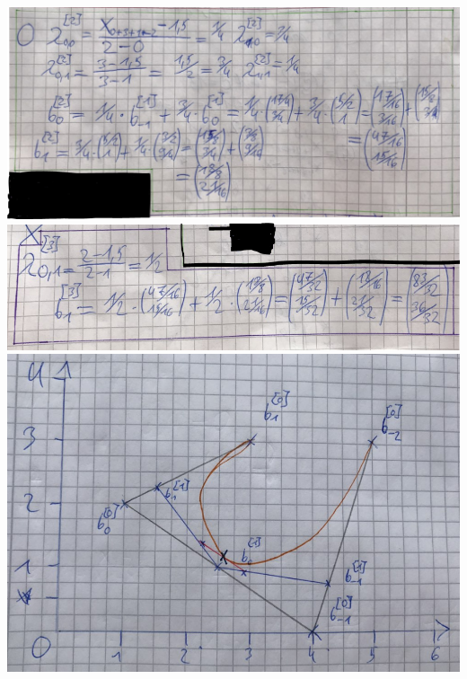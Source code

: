 \\
\includegraphics[scale=0.5]{1b)3.PNG}
\\
\includegraphics[scale=0.5]{1b)4.PNG}
\\
\includegraphics[scale=0.5]{1b)5.PNG}